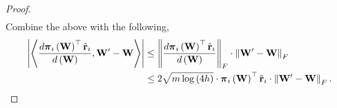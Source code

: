 \documentclass[10pt]{article}
\def\rvtilder{{\tilde{\mathbf{r}}}}
\def\rvpi{{\boldsymbol{\pi}}}
\def\rmW{{\mathbf{W}}}
\begin{document}
\begin{proof}
\begin{equation*}
\begin{split}
\end{split}
\end{equation*}
Combine the above with the following,
\begin{equation*}
\begin{split}
    \left| \left\langle \frac{d \rvpi_i\left( \rmW \right)^\top \rvtilder_i }{d\left( \rmW \right)}, \rmW^\prime - \rmW \right\rangle \right| &\le \left\| \frac{d \rvpi_i\left( \rmW \right)^\top \rvtilder_i }{d\left( \rmW \right)} \right\|_F \cdot \left\| \rmW^\prime - \rmW \right\|_F \\
    &\le 2 \sqrt{m \log{\left(4h\right)}} \cdot \rvpi_i\left( \rmW \right)^\top \rvtilder_i \cdot \left\| \rmW^\prime - \rmW \right\|_F. \qedhere
\end{split}
\end{equation*}
\end{proof}
\end{document}
